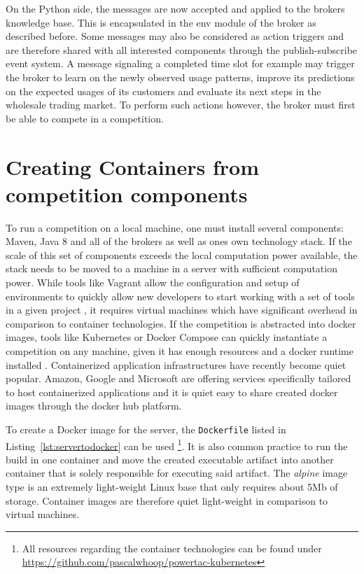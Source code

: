 On the Python side, the messages are now accepted and applied to the brokers knowledge base. This is encapsulated in the
env module of the broker as described before. Some messages may also be considered as action triggers and are therefore
shared with all interested components through the publish-subscribe event system. A message signaling a completed
time slot for example may trigger the broker to learn on the newly observed usage patterns, improve its predictions on
the expected usages of its customers and evaluate its next steps in the wholesale trading market. To perform such
actions however, the broker must first be able to compete in a competition.

\section{Creating Containers from competition components}
\label{sec:creating_containers_from_competition_components}

To run a competition on a local machine, one must install several components: Maven, Java 8 and all of the brokers as
well as ones own technology stack. If the scale of this set of components exceeds the local computation power available,
the stack needs to be moved to a machine in a server with sufficient computation power. While tools like Vagrant allow
the configuration and setup of environments to quickly allow new developers to start working with a set of tools in a
given project \citep{vagrant} , it requires virtual machines which have significant overhead in comparison to container
technologies. If the competition is abstracted into docker images, tools like Kubernetes or Docker Compose can quickly
instantiate a competition on any machine, given it has enough resources and a docker runtime installed \citep{docker}.
Containerized application infrastructures have recently become quiet popular. Amazon, Google and Microsoft are offering
services specifically tailored to host containerized applications and it is quiet easy to share created docker images
through the docker hub platform.

To create a Docker image for the server, the \texttt{Dockerfile} listed in Listing~\ref{lst:servertodocker} can be used
\footnote{All resources regarding the container technologies can be found under
\url{https://github.com/pascalwhoop/powertac-kubernetes}}.
It is also common practice to run the build in one container and move the created executable artifact into another
container that is solely responsible for executing said artifact. The \emph{alpine} image type is an extremely
light-weight Linux base that only requires about 5Mb of storage. Container images are therefore quiet light-weight in comparison
to virtual machines.


